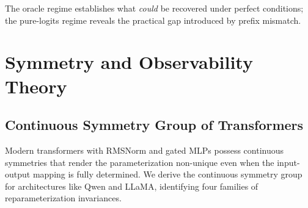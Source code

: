 \documentclass{article}
\begin{document}
The oracle regime establishes what \emph{could} be recovered under perfect conditions; the pure-logits regime reveals the practical gap introduced by prefix mismatch.


\section{Symmetry and Observability Theory}
\label{sec:theory}

\subsection{Continuous Symmetry Group of Transformers}
\label{sec:symmetry}

Modern transformers with RMSNorm and gated MLPs possess continuous symmetries that render the parameterization non-unique even when the input-output mapping is fully determined. We derive the continuous symmetry group for architectures like Qwen and LLaMA, identifying four families of reparameterization invariances.
\end{document}
